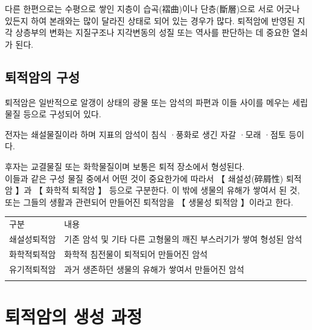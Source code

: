 \documentclass[12pt, a4paper, twoside]{book}
\begin{document}
				다른 한편으로는 수평으로 쌓인 지층이 습곡(褶曲)이나 단층(斷層)으로 서로 어긋나 있든지 하여 
				본래와는 많이 달라진 상태로 되어 있는 경우가 많다. 
				퇴적암에 반영된 지각 상층부의 변화는 지질구조나 지각변동의 성질 또는 역사를 판단하는 데 중요한 열쇠가 된다. 


	\clearpage
	\section{퇴적암의 구성}

				퇴적암은 일반적으로 알갱이 상태의 광물 또는 암석의 파편과 이들 사이를 메우는 세립물질 등으로 구성되어 있다.
				
				전자는 쇄설물질이라 하며 지표의 암석이 침식 ·풍화로 생긴 자갈 ·모래 ·점토 등이다. 
				
				후자는 교결물질 또는 화학물질이며 보통은 퇴적 장소에서 형성된다.  \\
				
				이들과 같은 구성 물질 중에서 어떤 것이 중요한가에 따라서 【 쇄설성(碎屑性) 퇴적암 】과 【 화학적 퇴적암 】 등으로 구분한다. 
				이 밖에 생물의 유해가 쌓여서 된 것, 또는 그들의 생활과 관련되어 만들어진 퇴적암을 【 생물성 퇴적암 】이라고 한다. 
				

				\begin{tabu} to 1.0\textwidth { X[l, 1.0] X[l, 4.0] }
				\tabucline[0.2ex]{-}		
				구분			&내용\\
				\tabucline[0.1ex]{-}		
				쇄설성퇴적암	&기존 암석 및 기타 다른 고형물의 깨진 부스러기가 쌓여 형성된 암석\\
				화학적퇴적암	&화학적 침전물이 퇴적되어 만들어진 암석\\
				유기적퇴적암	&과거 생존하던 생물의 유해가 쌓여서 만들어진 암석\\
				\tabucline[0.1ex]{-}		
				\end{tabu} 



	\clearpage
	\chapter{퇴적암의 생성 과정}
	\minitoc
	
\end{document}
